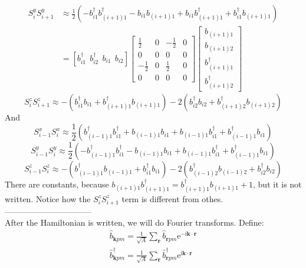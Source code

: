 \documentclass[letter]{article}
\newcommand{\e}{\mathrm{e}}
\newcommand{\ii}{\mathrm{i}}
\begin{document}
$$
\begin{aligned}
    S_{i}^y S_{i+1}^y &\approx\frac{1}{2}\left(-b_{i1}^{\dagger}b_{(i+1)1}^{\dagger}-b_{i1}b_{(i+1)1}+b_{i1}b_{(i+1)1}^{\dagger}+b_{i1}^{\dagger}b_{(i+1)1}\right)\\ &=\left[
        b_{i1}^{\dagger} \ \ 
        b_{i2}^{\dagger}\  \ 
        b_{i1}\ \ 
        b_{i2}\right]
        \begin{bmatrix}
            \frac{1}{2} & 0 & -\frac{1}{2} & 0 \\
           0 &  0 & 0 &0 \\
           -\frac{1}{2} &  0 & \frac{1}{2} &0\\
            0 & 0 & 0& 0
            \end{bmatrix}\begin{bmatrix}
                b_{(i+1)1}  \\
                b_{(i+1)2}  \\
                b_{(i+1)1}^{\dagger}\\
                b_{(i+1)2}^{\dagger}
                \end{bmatrix}
\end{aligned}
$$
$$
    S_{i}^z S_{i+1}^z \approx-\left(b_{i1}^{\dagger}b_{i1}+b_{(i+1)1}^{\dagger}b_{(i+1)1}\right)-2\left(b_{i2}^{\dagger}b_{i2}+b_{(i+1)2}^{\dagger}b_{(i+1)2}\right)
$$
And $$
S_{i-1}^x S_{i}^x  \approx\frac{1}{2}\left(b_{(i-1)1}^{\dagger}b_{i1}^{\dagger}+b_{(i-1)1}b_{i1}+b_{(i-1)1}b_{i1}^{\dagger}+b_{(i-1)1}^{\dagger}b_{i1}\right)
$$
$$
S_{i-1}^y S_{i}^y \approx\frac{1}{2}\left(-b_{(i-1)1}^{\dagger}b_{i1}^{\dagger}-b_{(i-1)1}b_{i1}+b_{(i-1)1}b_{i1}^{\dagger}+b_{(i-1)1}^{\dagger}b_{i1}\right)
$$
$$
    S_{i-1}^z S_{i}^z \approx-\left(b_{(i-1)1}^{\dagger}b_{(i-1)1}+b_{i1}^{\dagger}b_{i1}\right)-2\left(b_{(i-1)2}^{\dagger}b_{(i-1)2}+b_{i2}^{\dagger}b_{i2}\right)
$$
There are constants, because $b_{(i+1)1}b_{(i+1)1}^{\dagger}=b_{(i+1)1}^{\dagger}b_{(i+1)1}+1$, but it is not written. Notice how the $S_{i}^z S_{i+1}^z$  term is different from othes.\\
--------------------------------\\
After the Hamiltonian is written, we will do Fourier transforms. Define:
$$ \begin{aligned}
    \hat{b}_{\bm{k}pm}=\frac{1}{\sqrt{A}}\sum_{\bm{r}}\hat{b}_{\bm{r}pm}\e^{-\ii\bm{k}\cdot\bm{r}} \\
    \hat{b}_{\bm{k}pm}^{\dagger}=\frac{1}{\sqrt{A}}\sum_{\bm{r}}\hat{b}_{\bm{r}pm}^{\dagger}\e^{\ii\bm{k}\cdot\bm{r}}
    \end{aligned} $$
\end{document}
